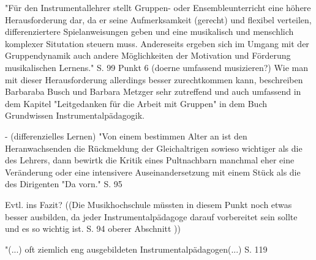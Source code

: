 "Für den Instrumentallehrer stellt Gruppen- oder Ensembleunterricht eine höhere
Herausforderung dar, da er seine Aufmerksamkeit (gerecht) und flexibel
verteilen, differenziertere Spielanweisungen geben und eine musikalisch und
menschlich komplexer Situtation steuern muss. Andereseits ergeben sich im Umgang
mit der Gruppendynamik auch andere Möglichkeiten der Motivation und Förderung
musikalischen Lernens." S. 99 Punkt 6 (doerne umfassend musizieren?)
Wie man mit dieser Herausforderung allerdings besser zurechtkommen kann,
beschreiben Barbaraba Busch und Barbara Metzger sehr zutreffend und auch
umfassend in dem Kapitel "Leitgedanken für die Arbeit mit Gruppen" in dem Buch
Grundwissen Instrumentalpädagogik. 


- (differenzielles Lernen)
"Von einem bestimmen Alter an ist den Heranwachsenden die Rückmeldung der
Gleichaltrigen sowieso wichtiger als die des Lehrers, dann bewirtk die Kritik
eines Pultnachbarn manchmal eher eine Veränderung oder eine intensivere
Auseinandersetzung mit einem Stück als die des Dirigenten "Da vorn." S. 95


Evtl. ins Fazit? ((Die Musikhochschule müssten in diesem Punkt noch etwas besser ausbilden, da
jeder Instrumentalpädagoge darauf vorbereitet sein sollte und es so wichtig ist.
S. 94 oberer Abschnitt ))

"(...) oft ziemlich eng ausgebildeten Instrumentalpädagogen(...) S. 119
